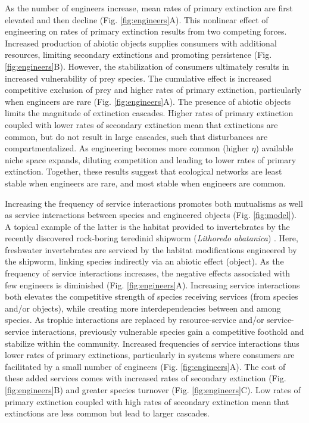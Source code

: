 \documentclass[9pt,twocolumn,twoside]{pnas-new}
\begin{document}
As the number of engineers increase, mean rates of primary extinction are first elevated and then decline (Fig. \ref{fig:engineers}A).
This nonlinear effect of engineering on rates of primary extinction results from two competing forces.
Increased production of abiotic objects supplies consumers with additional resources, limiting secondary extinctions and promoting persistence (Fig. \ref{fig:engineers}B).
However, the stabilization of consumers ultimately results in increased vulnerability of prey species.
The cumulative effect is increased competitive exclusion of prey and higher rates of primary extinction, particularly when engineers are rare (Fig. \ref{fig:engineers}A).
The presence of abiotic objects limits the magnitude of extinction cascades.
Higher rates of primary extinction coupled with lower rates of secondary extinction mean that extinctions are common, but do not result in large cascades, such that disturbances are compartmentalized.
As engineering becomes more common (higher $\eta$) available niche space expands, diluting competition and leading to lower rates of primary extinction.
Together, these results suggest that ecological networks are least stable when engineers are rare, and most stable when engineers are common.

Increasing the frequency of service interactions promotes both mutualisms as well as service interactions between species and engineered objects (Fig. \ref{fig:model}).
A topical example of the latter is the habitat provided to invertebrates by the recently discovered rock-boring teredinid shipworm (\emph{Lithoredo abatanica}) \cite{Shipway2019}.
Here, freshwater invertebrates are serviced by the habitat modifications engineered by the shipworm, linking species indirectly via an abiotic effect (object).
As the frequency of service interactions increases, the negative effects associated with few engineers is diminished (Fig. \ref{fig:engineers}A).
Increasing service interactions both elevates the competitive strength of species receiving services (from species and/or objects), while creating more interdependencies between and among species.
As trophic interactions are replaced by resource-service and/or service-service interactions, previously vulnerable species gain a competitive foothold and stabilize within the community.
Increased frequencies of service interactions thus lower rates of primary extinctions, particularly in systems where consumers are facilitated by a small number of engineers (Fig. \ref{fig:engineers}A).
The cost of these added services comes with increased rates of secondary extinction (Fig. \ref{fig:engineers}B) and greater species turnover (Fig. \ref{fig:engineers}C).
Low rates of primary extinction coupled with high rates of secondary extinction mean that extinctions are less common but lead to larger cascades.
\end{document}
